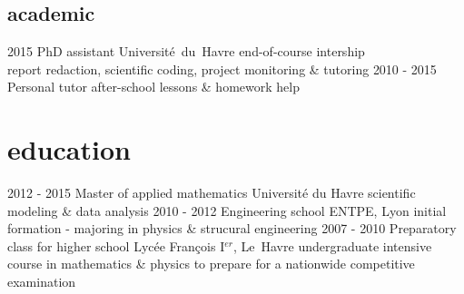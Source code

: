 \documentclass[a4paper]{farangoth-cv}
\begin{document}
\subsection{academic}
\begin{entrylist}
  \entry%
  {2015}
  {PhD assistant}
  {\mbox{Université du Havre}}
  {%
    end-of-course intership\\
    report redaction, scientific coding, project monitoring \& tutoring
  }
  \entry%
  {2010 \-- 2015}
  {Personal tutor}
  {}
  {%
    after-school lessons \& homework help
  }
\end{entrylist}

  

\section{education}
\begin{entrylist}
  \entry%
  {2012 \-- 2015}
  {Master of applied mathematics}
  {Université du Havre}
  {%
    scientific modeling \& data analysis
  }
  \entry%
  {2010 \-- 2012}
  {Engineering school}
  {ENTPE, Lyon}
  {%
    initial formation - majoring in physics \& strucural engineering
  }
  \entry%
  {2007 \-- 2010}
  {Preparatory class for higher school}
  {Lycée François I$^{er}$, \mbox{Le Havre}}
  {%
    undergraduate intensive course in mathematics \& physics to prepare for a nationwide competitive examination
  }
\end{entrylist}

\makefooter{}
\end{document}
